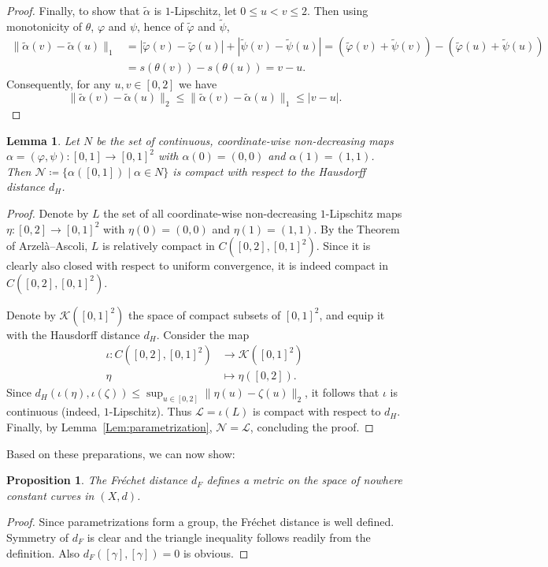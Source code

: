 \documentclass[a4paper,11pt]{article}
\numberwithin{equation}{section}
\theoremstyle{plain}
\newtheorem{Proposition}[Definition]{Proposition}
\newtheorem{Lemma}[Definition]{Lemma}
\theoremstyle{definition}
\begin{document}
\begin{appendices}
\begin{proof}
Finally, to show that $\tilde \alpha$ is $1$-Lipschitz, let $0\le u<v\le 2$. Then using monotonicity of $\theta$, $\varphi$ and $\psi$,
hence of $\tilde \varphi$ and $\tilde\psi$,
\begin{align*}
\| \tilde\alpha(v) - \tilde \alpha(u)\|_1 &= |\tilde\varphi(v) - \tilde\varphi(u)| + |\tilde\psi(v)-\tilde\psi(u)|
= (\tilde\varphi(v) + \tilde\psi(v)) - (\tilde\varphi(u) + \tilde\psi(u))\\ 
&= s(\theta(v)) - s(\theta(u)) = v-u.
\end{align*}
Consequently, for any $u,v\in [0,2]$ we have
\[
\| \tilde\alpha(v) - \tilde \alpha(u)\|_2 \le \| \tilde\alpha(v) - \tilde \alpha(u)\|_1 \le |v-u|.
\]
\end{proof}
\begin{Lemma}\label{Lem:parametrizations-Hausdorff-compact}
Let $N$ be the set of continuous, coordinate-wise non-decreasing maps $\alpha=(\varphi,\psi) \colon [0,1]\to [0,1]^2$ with $\alpha(0) = (0,0)$
and $\alpha(1)=(1,1)$. Then $\mathcal{N} \coloneqq \{\alpha([0,1]) \mid \alpha\in N\}$ is compact with respect to the Hausdorff distance $d_H$.
\end{Lemma}
\begin{proof} Denote by $L$ the set of all coordinate-wise non-decreasing $1$-Lipschitz maps $\eta \colon [0,2]\to [0,1]^2$ with $\eta(0)=(0,0)$ and $\eta(1)=(1,1)$. By the Theorem of Arzel\`a--Ascoli, $L$ is relatively compact in $C([0,2],[0,1]^2)$. 
Since it is clearly also closed with respect to uniform convergence, it is indeed compact in $C([0,2],[0,1]^2)$.

Denote by $\mathcal{K}([0,1]^2)$ the space of compact subsets of $[0,1]^2$, and equip it with the Hausdorff distance $d_H$. Consider the map 
\begin{align*}
    \iota \colon C([0,2],[0,1]^2) &\to \mathcal{K}([0,1]^2)\\
    \eta &\mapsto \eta([0,2]).
\end{align*}
Since $d_H(\iota(\eta), \iota(\zeta)) \le \sup_{u\in [0,2]} \|\eta(u) - \zeta(u)\|_2 $, it follows that $\iota$ is continuous (indeed, $1$-Lipschitz). Thus $\mathcal{L} = \iota(L)$ is compact with respect to $d_H$. Finally, by Lemma~\ref{Lem:parametrization}, $\mathcal{N} = \mathcal{L}$, concluding the proof.
\end{proof}




Based on these preparations, we can now show:
\begin{Proposition}\label{Prop:Frechet-distance} The Fr\'echet distance $d_F$ defines a metric on the space of nowhere constant curves in $(X,d)$.  
\end{Proposition}
\begin{proof} Since parametrizations form a group, the Fr\'echet distance is well defined. Symmetry of $d_F$ is clear and the triangle inequality follows readily from the definition. Also $d_F([\gamma],[\gamma])=0$ is obvious. 


\end{proof}
\end{appendices}
\end{document}
